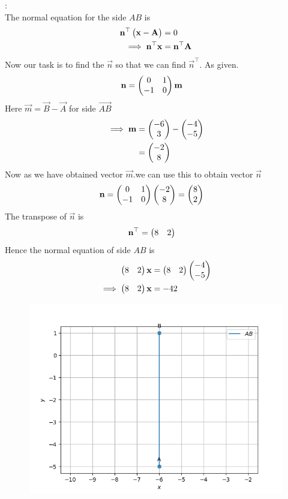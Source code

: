 \documentclass[11pt]{book}
\begin{document}
\begin{enumerate}[label=\thesection.\arabic*.,ref=\thesection.\theenumi]
\solution:\\
       The normal equation for the side $AB$ is
\begin{align}
\mathbf{n}^{\top}\begin{pmatrix}\mathbf{x}-\mathbf{A}\end{pmatrix}&=0\\
\implies
\mathbf{n}^{\top}\mathbf{x}&=\mathbf{n}^{\top}\mathbf{A}
\end{align}
Now our task is to find the $\vec{n}$ so that we can find $\vec{n}^{\top}$.
As given. 
\begin{align}
  \mathbf{n} &= \begin{pmatrix}0 & 1\\
  -1 & 0\end{pmatrix}\mathbf{m}
\end{align}
Here $\vec{m} = \vec{B}- \vec{A}$ for side $\vec{AB}$
\begin{align}
\implies
\mathbf{m}&=\begin{pmatrix}-6\\3\end{pmatrix} - \begin{pmatrix}-4\\-5\end{pmatrix}\\
&=\begin{pmatrix}-2\\8\end{pmatrix}
\end{align}
Now as we have obtained vector $\vec{m}$.we can use this to obtain vector $\vec{n}$
\begin{align}
\mathbf{n}  &= \begin{pmatrix}0 & 1\\
  -1 & 0\end{pmatrix}\begin{pmatrix}-2\\8\end{pmatrix}
  = \begin{pmatrix}8\\2\end{pmatrix}
\end{align}
The transpose of $\vec{n}$ is
\begin{align}
  \mathbf{n}^{\top}&=\begin{pmatrix}8 & 2\end{pmatrix}
\end{align}
Hence the normal equation of side $AB$ is 
\begin{align}
    \begin{pmatrix}8 & 2\end{pmatrix}\mathbf{x}&=\begin{pmatrix}8 & 2\end{pmatrix}\begin{pmatrix}-4\\-5\end{pmatrix}\\
    \implies \begin{pmatrix}8 & 2\end{pmatrix}\mathbf{x} &= -42
\end{align}
\begin{figure}[H]
\includegraphics [width=\columnwidth] {figs/AB.png}

\end{figure}
\end{enumerate}
\end{document}
